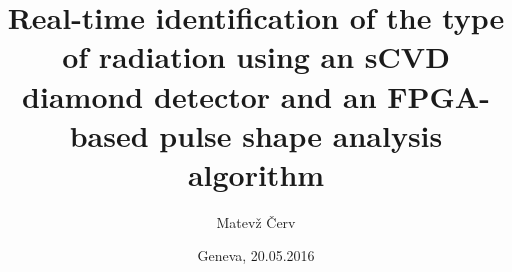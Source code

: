 \documentclass[11pt,titlepage]{article}
\title{Real-time identification of the type of radiation using an sCVD diamond detector and an FPGA-based pulse shape analysis algorithm}
\author{Matev\v{z} \v{C}erv}
\date{Geneva, 20.05.2016}
\begin{document}
 
\maketitle

\newpage



{}

\end{document}
